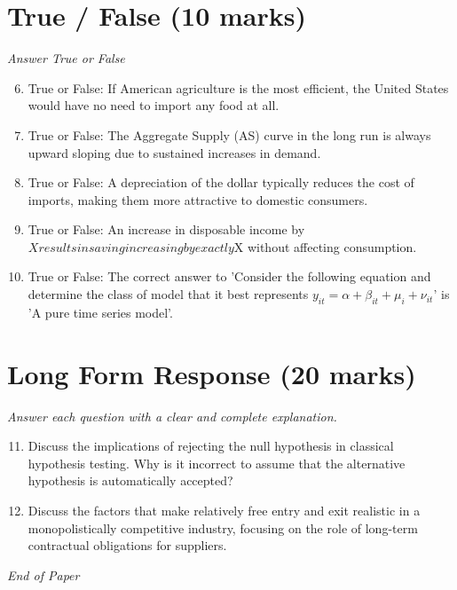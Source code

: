 \documentclass[12pt]{article}
\begin{document}
\section*{True / False (10 marks)}
\textit{Answer True or False}
\begin{enumerate}[label=\arabic*.]
\setcounter{enumi}{5}
\item True or False: If American agriculture is the most efficient, the United States would have no need to import any food at all.
\item True or False: The Aggregate Supply (AS) curve in the long run is always upward sloping due to sustained increases in demand.
\item True or False: A depreciation of the dollar typically reduces the cost of imports, making them more attractive to domestic consumers.
\item True or False: An increase in disposable income by $X results in saving increasing by exactly $X without affecting consumption.
\item True or False: The correct answer to 'Consider the following equation and determine the class of model that it best represents $y_{it} = \alpha + \beta_{it} + \mu_i + \nu_{it}$' is 'A pure time series model'.
\end{enumerate}

\section*{Long Form Response (20 marks)}
\textit{Answer each question with a clear and complete explanation.}
\begin{enumerate}[label=\arabic*.]
\setcounter{enumi}{10}
\item Discuss the implications of rejecting the null hypothesis in classical hypothesis testing. Why is it incorrect to assume that the alternative hypothesis is automatically accepted?
\item Discuss the factors that make relatively free entry and exit realistic in a monopolistically competitive industry, focusing on the role of long-term contractual obligations for suppliers.
\end{enumerate}

\vfill
\noindent\textit{End of Paper}
\end{document}

